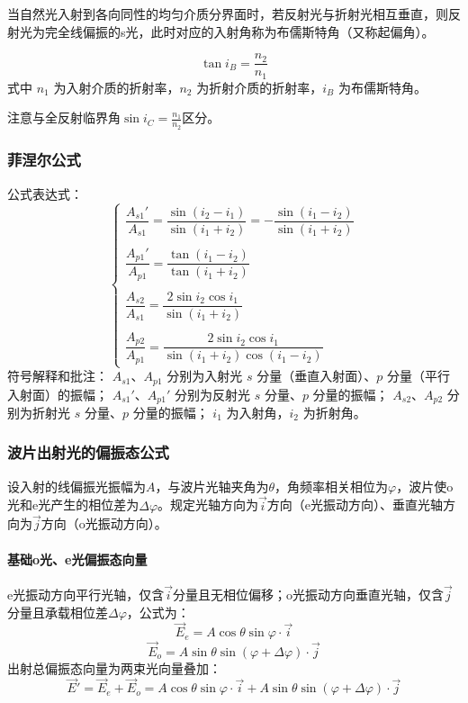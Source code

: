 \documentclass{article}
\begin{document}
	当自然光入射到各向同性的均匀介质分界面时，若反射光与折射光相互垂直，则反射光为完全线偏振的s光，此时对应的入射角称为布儒斯特角（又称起偏角）。
	
	$$\tan i_B = \frac{n_2}{n_1}$$
	式中 $n_1$ 为入射介质的折射率，$n_2$ 为折射介质的折射率，$i_B$ 为布儒斯特角。
	
	注意与全反射临界角$\sin i_C = \frac{n_1}{n_2}$区分。
	
	\subsubsection{菲涅尔公式}
	公式表达式：
	\[
	\begin{cases}
		\dfrac{A_{s1}'}{A_{s1}} = \dfrac{\sin(i_2 - i_1)}{\sin(i_1 + i_2)} = -\dfrac{\sin(i_1 - i_2)}{\sin(i_1 + i_2)} \\
		\\
		\dfrac{A_{p1}'}{A_{p1}} = \dfrac{\tan(i_1 - i_2)}{\tan(i_1 + i_2)} \\
		\\
		\dfrac{A_{s2}}{A_{s1}} = \dfrac{2\sin i_2\cos i_1}{\sin(i_1 + i_2)} \\
		\\
		\dfrac{A_{p2}}{A_{p1}} = \dfrac{2\sin i_2\cos i_1}{\sin(i_1 + i_2)\cos(i_1 - i_2)}
	\end{cases}
	\]
	符号解释和批注：
	\(A_{s1}\)、\(A_{p1}\) 分别为入射光 \(s\) 分量（垂直入射面）、\(p\) 分量（平行入射面）的振幅；
	\(A_{s1}'\)、\(A_{p1}'\) 分别为反射光 \(s\) 分量、\(p\) 分量的振幅；
	\(A_{s2}\)、\(A_{p2}\) 分别为折射光 \(s\) 分量、\(p\) 分量的振幅；
	\(i_1\) 为入射角，\(i_2\) 为折射角。
		
	\subsubsection{波片出射光的偏振态公式}
	设入射的线偏振光振幅为\(A\)，与波片光轴夹角为\(\theta\)，角频率相关相位为\(\varphi\)，波片使o光和e光产生的相位差为\(\Delta\varphi\)。规定光轴方向为\(\vec{i}\)方向（e光振动方向）、垂直光轴方向为\(\vec{j}\)方向（o光振动方向）。
	
	\paragraph{基础o光、e光偏振态向量}
	e光振动方向平行光轴，仅含\(\vec{i}\)分量且无相位偏移；o光振动方向垂直光轴，仅含\(\vec{j}\)分量且承载相位差\(\Delta\varphi\)，公式为：
	\[
	\vec{E}_e = A\cos\theta\sin\varphi \cdot\vec{i}
	\]
	\[
	\vec{E}_o = A\sin\theta\sin(\varphi+\Delta\varphi) \cdot\vec{j}
	\]
	出射总偏振态向量为两束光向量叠加：
	\[
	\vec{E}' = \vec{E}_e+\vec{E}_o = A\cos\theta\sin\varphi \cdot\vec{i} + A\sin\theta\sin(\varphi+\Delta\varphi) \cdot\vec{j}
	\]
	
\end{document}
